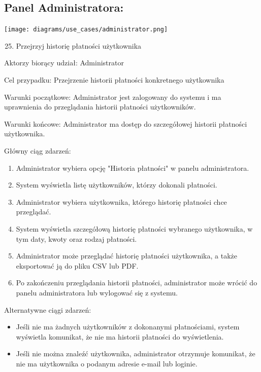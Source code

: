 \documentclass[
]{article}
\providecommand{\tightlist}{%
  \setlength{\itemsep}{0pt}\setlength{\parskip}{0pt}}
\begin{document}
\hypertarget{h.sjnlhh288rjz}{%
\subsection{\texorpdfstring{{Panel
Administratora:}}{Panel Administratora:}}\label{h.sjnlhh288rjz}}

{\texttt{[image: diagrams/use\_cases/administrator.png]}}

\begin{enumerate}
\setcounter{enumi}{24}
\tightlist
\item
  {Przejrzyj historię płatności użytkownika}
\end{enumerate}

{Aktorzy biorący udział: Administrator}

{Cel przypadku: Przejrzenie historii płatności konkretnego użytkownika}

{Warunki początkowe: Administrator jest zalogowany do systemu i ma
uprawnienia do przeglądania historii płatności użytkowników.}

{Warunki końcowe: Administrator ma dostęp do szczegółowej historii
płatności użytkownika.}

{Główny ciąg zdarzeń:}

\begin{enumerate}
\tightlist
\item
  {Administrator wybiera opcję "Historia płatności" w panelu
  administratora.}
\item
  {System wyświetla listę użytkowników, którzy dokonali płatności.}
\item
  {Administrator wybiera użytkownika, którego historię płatności chce
  przeglądać.}
\item
  {System wyświetla szczegółową historię płatności wybranego
  użytkownika, w tym daty, kwoty oraz rodzaj płatności.}
\item
  {Administrator może przeglądać historię płatności użytkownika, a także
  eksportować ją do pliku CSV lub PDF.}
\item
  {Po zakończeniu przeglądania historii płatności, administrator może
  wrócić do panelu administratora lub wylogować się z systemu.}
\end{enumerate}

{Alternatywne ciągi zdarzeń:}

\begin{itemize}
\tightlist
\item
  {Jeśli nie ma żadnych użytkowników z dokonanymi płatnościami, system
  wyświetla komunikat, że nie ma historii płatności do wyświetlenia.}
\item
  {Jeśli nie można znaleźć użytkownika, administrator otrzymuje
  komunikat, że nie ma użytkownika o podanym adresie e-mail lub
  loginie.}
\end{itemize}
\end{document}
